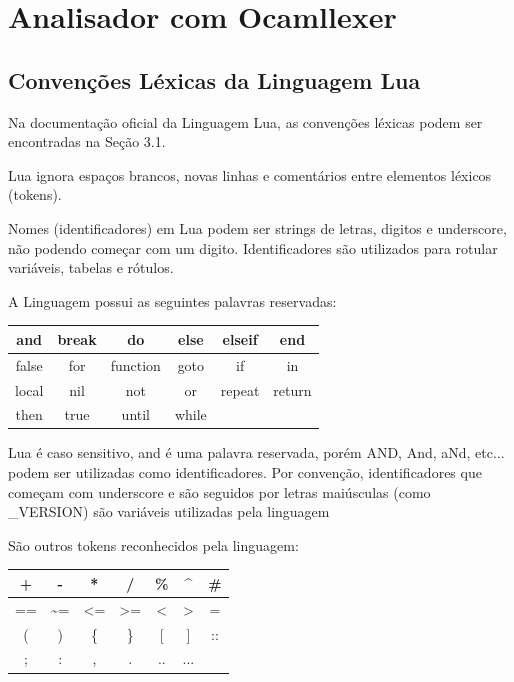 \documentclass[12pt,a4paper,twoside]{report}
\begin{document}
\section{Analisador com Ocamllexer}
\subsection{Convenções Léxicas da Linguagem Lua}
Na documentação oficial da Linguagem Lua, as convenções léxicas podem ser encontradas na Seção 3.1.

Lua ignora espaços brancos, novas linhas e comentários entre elementos léxicos (tokens).

Nomes (identificadores) em Lua podem ser strings de letras, digitos e underscore, não podendo começar com um digito. Identificadores são utilizados para rotular variáveis, tabelas e rótulos.

A Linguagem possui as seguintes palavras reservadas:

\begin{center}
\begin{tabular} {| c | c | c | c | c | c | }
\hline
and & break & do & else & elseif & end \\
\hline
false & for & function & goto & if & in \\
\hline
local & nil & not & or & repeat & return \\
\hline
then & true & until & while & &\\
\hline
\end{tabular}
\end{center}

Lua é caso sensitivo, and é uma palavra reservada, porém AND, And, aNd, etc... podem ser utilizadas como identificadores. Por convenção, identificadores que começam com underscore e são seguidos por letras maiúsculas (como \_VERSION) são variáveis utilizadas pela linguagem

São outros tokens reconhecidos pela linguagem:


\begin{center}
\begin{tabular} {| c | c | c | c | c | c | c |}
\hline
+ & - & * & / & \% & \^{} & \# \\
\hline
== & \~{}= & <= & >= & < & > & =\\
\hline
( & ) & \{ & \} & [ & ] & ::\\
\hline
; & : & , & . & .. & ... & \\
\hline
\end{tabular}
\end{center}
\end{document}
